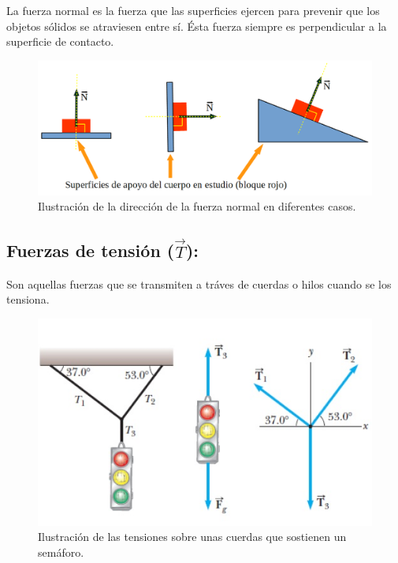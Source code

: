 La fuerza normal es la fuerza que las superficies ejercen para prevenir que los objetos sólidos se atraviesen entre sí. Ésta 
fuerza siempre es perpendicular a la superficie de contacto.

\begin{figure}[ht]
 \centering
 \includegraphics[scale=0.2]{images/fuerzanormal.png}
 \caption{Ilustración de la dirección de la fuerza normal en diferentes casos.}\label{ac}
\end{figure}

\subsection{Fuerzas de tensión ($\vec{T}$):}

Son aquellas fuerzas que se transmiten a tráves de cuerdas o hilos cuando se los tensiona.

\begin{figure}[ht]
 \centering
 \includegraphics[scale=0.7]{images/tensiones.jpg}
 \caption{Ilustración de las tensiones sobre unas cuerdas que sostienen un semáforo.}\label{ac}
\end{figure}

